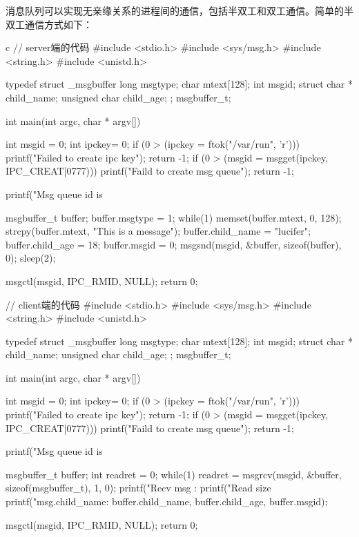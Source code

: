 消息队列可以实现无亲缘关系的进程间的通信，包括半双工和双工通信。简单的半双工通信方式如下：
\begin{code-block}{c}
// server端的代码
#include <stdio.h>
#include <sys/msg.h>
#include <string.h>
#include <unistd.h>

typedef struct _msgbuffer{
        long msgtype;
        char mtext[128];
        int msgid;
        struct {
            char * child_name;
            unsigned char child_age;
        };
}msgbuffer_t;

int main(int argc, char * argv[])
{
        int msgid = 0;
        int ipckey= 0;
        if (0 > (ipckey = ftok("/var/run", 'r')))
        {
                printf("Failed to create ipc key\n");
                return -1;
        }
        if (0 > (msgid = msgget(ipckey, IPC_CREAT|0777)))
        {
                printf("Faild to create msg queue\n");
                return -1;
        }

        printf("Msg queue id is %

        msgbuffer_t buffer;
        buffer.msgtype = 1;
        while(1)
        {
                memset(buffer.mtext, 0, 128);
                strcpy(buffer.mtext, "This is a message");
                buffer.child_name = "lucifer";
                buffer.child_age = 18;
                buffer.msgid = 0;
                msgsnd(msgid, &buffer, sizeof(buffer), 0);
                sleep(2);
        }

        msgctl(msgid, IPC_RMID, NULL);
        return 0;
}

// client端的代码
#include <stdio.h>
#include <sys/msg.h>
#include <string.h>
#include <unistd.h>

typedef struct _msgbuffer{
        long msgtype;
        char mtext[128];
        int msgid;
        struct {
            char * child_name;
            unsigned char child_age;
        };
}msgbuffer_t;

int main(int argc, char * argv[])
{
        int msgid = 0;
        int ipckey= 0;
        if (0 > (ipckey = ftok("/var/run", 'r')))
        {
                printf("Failed to create ipc key\n");
                return -1;
        }
        if (0 > (msgid = msgget(ipckey, IPC_CREAT|0777)))
        {
                printf("Faild to create msg queue\n");
                return -1;
        }

        printf("Msg queue id is %

        msgbuffer_t buffer;
        int readret = 0;
        while(1)
        {
                readret = msgrcv(msgid, &buffer,
                        sizeof(msgbuffer_t), 1, 0);
                printf("Recv msg :%
                printf("Read size %
                printf("msg.child_name: %
                        buffer.child_name, buffer.child_age, buffer.msgid);
        }

        msgctl(msgid, IPC_RMID, NULL);
        return 0;
}
\end{code-block}

